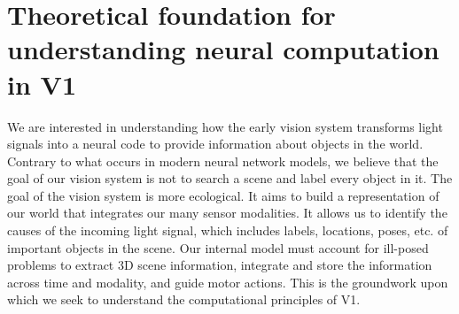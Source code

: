 %
%
%
%
%
%
%
%


\section{Theoretical foundation for understanding neural computation in V1}\label{sec:ch1_theory}
We are interested in understanding how the early vision system transforms light signals into a neural code to provide information about objects in the world.
Contrary to what occurs in modern neural network models, we believe that the goal of our vision system is not to search a scene and label every object in it. The goal of the vision system is more ecological. It aims to build a representation of our world that integrates our many sensor modalities. It allows us to identify the causes of the incoming light signal, which includes labels, locations, poses, etc. of important objects in the scene. Our internal model must account for ill-posed problems to extract 3D scene information, integrate and store the information across time and modality, and guide motor actions. This is the groundwork upon which we seek to understand the computational principles of V1.

